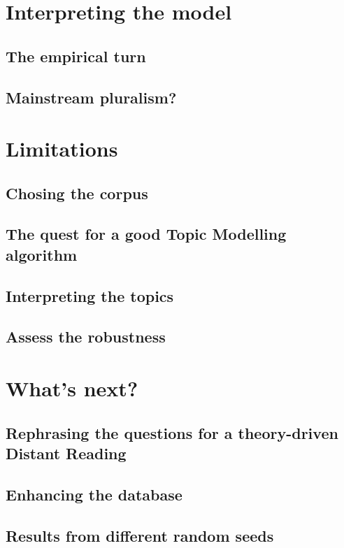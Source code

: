 \documentclass[a4paper, headings=standardclasses]{scrartcl}
\begin{document}
  \section{Interpreting the model}

  \subsection{The empirical turn}

  \subsection{Mainstream pluralism?}

  \section{Limitations}
  \subsection{Chosing the corpus}

  \subsection{The quest for a good Topic Modelling algorithm}

  \subsection{Interpreting the topics}

  \subsection{Assess the robustness}

  \section{What's next?}
  \subsection{Rephrasing the questions for a theory-driven Distant Reading}

  \subsection{Enhancing the database}

  \clearpage
  \printbibliography
  \clearpage

  \begin{appendices}
  \section{Results from different random seeds}

  \end{appendices}
\end{document}
